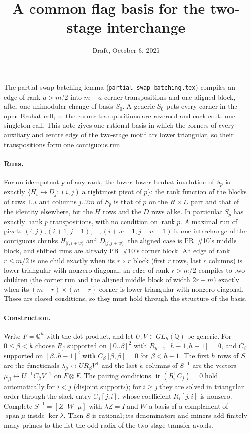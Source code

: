 \documentclass[11pt]{article}
\title{A common flag basis for the two-stage interchange}
\date{Draft, October 8, 2026}
\theoremstyle{remark}\newtheorem*{remark}{Remark}
\begin{document}
\maketitle

The partial-swap batching lemma (\texttt{partial-swap-batching.tex}) compiles an edge of rank $a>m/2$ into
$m-a$ corner transpositions and one aligned block, after one unimodular change of basis $S_0$. A generic $S_0$
puts every corner in the open Bruhat cell, so the corner transpositions are reversed and each costs one
singleton call. This note gives one rational basis in which the corners of every auxiliary and centre edge of
the two-stage motif are lower triangular, so their transpositions form one contiguous run.

\paragraph{Runs.} For an idempotent $p$ of any rank, the lower--lower Bruhat involution of $S_p$ is exactly
$\{H_i\leftrightarrow D_j:(i,j)\text{ a rightmost pivot of }p\}$: the rank function of the blocks of rows $1..i$ and
columns $j..2m$ of $S_p$ is that of $p$ on the $H\times D$ part and that of the identity elsewhere, for the $H$ rows
and the $D$ rows alike. In particular $S_p$ has exactly $\operatorname{rank}p$ transpositions, with no condition on
$\operatorname{rank}p$. A maximal run of pivots
$(i,j),(i+1,j+1),\dots,(i+w-1,j+w-1)$ is one interchange of the contiguous chunks $H_{[i,i+w)}$ and $D_{[j,j+w)}$:
the aligned case is PR~\#10's middle block, and shifted runs are already PR~\#10's corner block.
An edge of rank $r\le m/2$ is one child exactly when its $r\times r$ block (first $r$ rows, last $r$ columns) is
lower triangular with nonzero diagonal; an edge of rank $r>m/2$ compiles to two children (the corner run and the
aligned middle block of width $2r-m$) exactly when its $(m-r)\times(m-r)$ corner is lower triangular with nonzero
diagonal. These are closed conditions, so they must hold through the structure of the basis.

\paragraph{Construction.} Write $F=\mathbb Q^h$ with the dot product, and let $U,V\in GL_h(\mathbb Q)$ be generic.
For $0\le\beta<h$ choose $R_\beta$ supported on $[0..\beta]^2$ with $R_{h-1}[h-1,h-1]=0$, and $C_\beta$ supported on
$[\beta..h-1]^2$ with $C_\beta[\beta,\beta]=0$ for $\beta<h-1$. The first $h$ rows of $S$ are the functionals
$\lambda_\beta\leftrightarrow UR_\beta V^{\mathsf T}$ and the last $h$ columns of $S^{-1}$ are the vectors
$\mu_\beta\leftrightarrow U^{-\mathsf T}C_\beta V^{-1}$ on $F\otimes F$.
The pairing conditions $\operatorname{tr}(R_i^{\mathsf T}C_j)=0$ hold automatically for $i<j$ (disjoint supports);
for $i\ge j$ they are solved in triangular order through the slack entry $C_j[j,i]$, whose coefficient
$R_i[j,i]$ is nonzero. Complete $S^{-1}=[Z\,|\,W\,|\,\mu]$ with $\lambda Z=I$ and $W$ a basis of a complement of
$\operatorname{span}\mu$ inside $\ker\lambda$. Then $S$ is rational; its denominators and minors add finitely many
primes to the list the odd radix of the two-stage transfer avoids.
\end{document}
